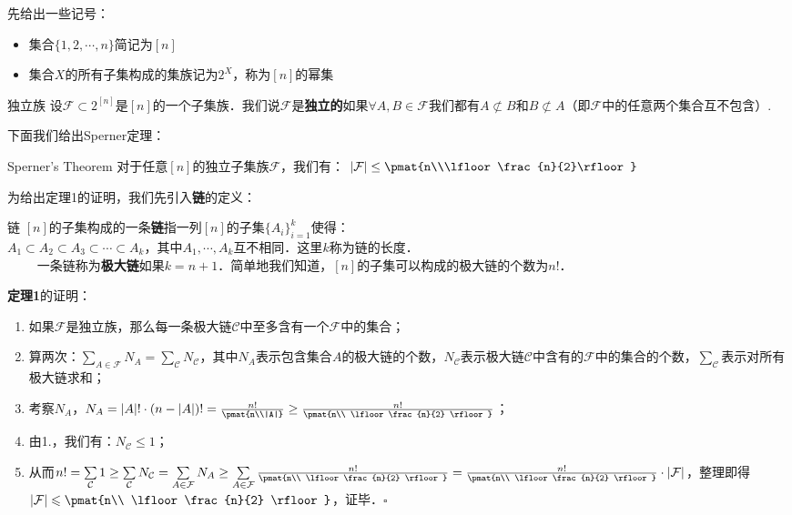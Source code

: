 
先给出一些记号：
\begin{itemize}
\item 集合$\{1,2,\cdots,n\}$简记为$[n]$
\item 集合$X$的所有子集构成的集族记为$2^{X}$，称为$[n]$的幂集
\end{itemize}

\begin{definition}{独立族}
设$\mathcal{F}\subset 2^{[n]}$是$[n]$的一个子集族．我们说$\mathcal{F}$是\textbf{独立的}如果$\forall A,B\in \mathcal{F}$我们都有$A\not\subset B$和$B\not\subset A$（即$\mathcal{F}$中的任意两个集合互不包含）.
\end{definition}

下面我们给出Sperner定理：
\begin{theorem}{Sperner's Theorem}
对于任意$[n]$的独立子集族$\mathcal{F}$，我们有：
$|\mathcal{F}|\leq \pmat{n\\\lfloor \frac{n}{2}\rfloor}$
\end{theorem}
为给出定理1的证明，我们先引入\textbf{链}的定义：
\begin{definition}{链}
$[n]$的子集构成的一条\textbf{链}指一列$[n]$的子集$\{A_i\}_{i=1}^{k}$使得：\\
$A_1\subset A_2\subset A_3\subset \cdots \subset A_k$，其中$A_1,\cdots,A_k$互不相同．这里$k$称为链的长度．\\
$\qquad$
一条链称为\textbf{极大链}如果$k=n+1$．简单地我们知道，$[n]$的子集可以构成的极大链的个数为$n!$．
\end{definition}

\textbf{定理1}的证明：\\
\begin{enumerate}
\item 如果$\mathcal{F}$是独立族，那么每一条极大链$\mathcal{C}$中至多含有一个$\mathcal{F}$中的集合；
\item 算两次：$\sum\limits_{A\in \mathcal{F}}N_A=\sum\limits_{\mathcal{C}}N_{\mathcal{C}}$，其中$N_A$表示包含集合$A$的极大链的个数，$N_{\mathcal{C}}$表示极大链$\mathcal{C}$中含有的$\mathcal{F}$中的集合的个数，$\sum\limits_{\mathcal{C}}$表示对所有极大链求和；
\item 考察$N_A$，$N_A=|A|!\cdot (n-|A|)!=\frac{n!}{\pmat{n\\|A|}}\geq \frac{n!}{\pmat{n\\ \lfloor\frac{n}{2} \rfloor}}$；
\item 由1.，我们有：$N_{\mathcal{C}}\leq 1$；
\item 从而$n!=\sum\limits_{\mathcal{C}}1\geq \sum\limits_{\mathcal{C}}N_{\mathcal{C}}=\sum\limits_{A\in \mathcal{F}}N_A\geq \sum\limits_{A\in \mathcal{F}}\frac{n!}{\pmat{n\\ \lfloor\frac{n}{2} \rfloor}}=\frac{n!}{\pmat{n\\ \lfloor\frac{n}{2} \rfloor}}\cdot |\mathcal{F}|$，整理即得$|\mathcal{F}|\leqslant\pmat{n\\ \lfloor\frac{n}{2} \rfloor}$，证毕．$\square$
\end{enumerate}

